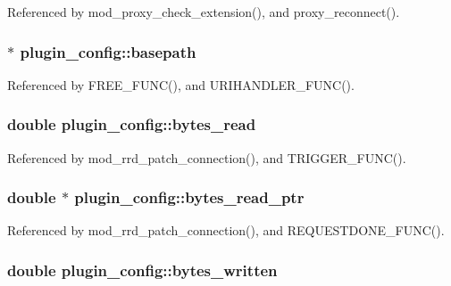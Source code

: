 Referenced by mod\-\_\-proxy\-\_\-check\-\_\-extension(), and proxy\-\_\-reconnect().

\hypertarget{structplugin__config_acb95a158e6542864ded7fb961bdf4414}{
\subsubsection[{basepath}]{$\ast$ plugin\-\_\-config\-::basepath}}\label{structplugin__config_acb95a158e6542864ded7fb961bdf4414}


Referenced by F\-R\-E\-E\-\_\-\-F\-U\-N\-C(), and U\-R\-I\-H\-A\-N\-D\-L\-E\-R\-\_\-\-F\-U\-N\-C().

\hypertarget{structplugin__config_a23c664d4a7e04e73cadd7da496f81fab}{
\subsubsection[{bytes\-\_\-read}]{\setlength{\rightskip}{0pt plus 5cm}double plugin\-\_\-config\-::bytes\-\_\-read}}\label{structplugin__config_a23c664d4a7e04e73cadd7da496f81fab}


Referenced by mod\-\_\-rrd\-\_\-patch\-\_\-connection(), and T\-R\-I\-G\-G\-E\-R\-\_\-\-F\-U\-N\-C().

\hypertarget{structplugin__config_ab4bd126e1de23cb09e70c54454281b52}{
\subsubsection[{bytes\-\_\-read\-\_\-ptr}]{\setlength{\rightskip}{0pt plus 5cm}double $\ast$ plugin\-\_\-config\-::bytes\-\_\-read\-\_\-ptr}}\label{structplugin__config_ab4bd126e1de23cb09e70c54454281b52}


Referenced by mod\-\_\-rrd\-\_\-patch\-\_\-connection(), and R\-E\-Q\-U\-E\-S\-T\-D\-O\-N\-E\-\_\-\-F\-U\-N\-C().

\hypertarget{structplugin__config_a7918a8c2b4842e7783e02297c2f614ee}{
\subsubsection[{bytes\-\_\-written}]{\setlength{\rightskip}{0pt plus 5cm}double plugin\-\_\-config\-::bytes\-\_\-written}}\label{structplugin__config_a7918a8c2b4842e7783e02297c2f614ee}



